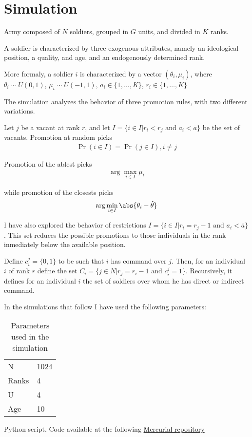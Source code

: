 \section{Simulation}
\label{sec:simulation}

Army composed of $N$ soldiers, grouped in $G$ units, and divided in $K$ ranks.

A soldier is characterized by three exogenous attributes, namely an ideological position, a quality, and age, and an
endogenously determined rank.

More formaly, a soldier $i$ is characterized by a vector $(\theta_i, \mu_i)$, where $\theta_i \sim U(0,1)$, $\mu_i \sim U(-1,1)$, $a_i
\in \{1, \dots ,K\}$, $r_i \in \{1, \dots, K\}$

The simulation analyzes the behavior of three promotion rules, with two different variations. 

Let $j$ be a vacant at rank $r$, and let $I = \{i \in I | r_i < r_j \text{ and } a_i < \overline{a}\}$ be the set of
vacants. Promotion at random picks 
\begin{eqnarray*}
 \Pr(i \in I) = \Pr(j \in I), i \neq j
\end{eqnarray*}

Promotion of the ablest picks 
\begin{eqnarray*}
  \arg\max_{i \in I} \mu_i
\end{eqnarray*}

while promotion of the closests picks
\begin{eqnarray*}
  \arg\min_{i \in I} \abs{\theta_i - \hat \theta}
\end{eqnarray*}

I have also explored the behavior of restrictions $I = \{i \in I | r_i = r_j - 1 \text{ and } a_i <
\overline{a}\}$. This set reduces the possible promotions to those individuals in the rank inmediately below the
available position.

Define $c_i^j = \{0, 1\}$ to be such that $i$ has command over $j$. Then, for an individual $i$ of rank $r$ define the
set $C_i = \{j \in N | r_j = r_i - 1 \text{ and } c_i^j = 1\}$. Recursively, it defines for an individual $i$ the set of
soldiers over whom he has direct or indirect command.

In the simulations that follow I have used the following parameters: 

\begin{table}[!h]
  \centering
  \caption{Parameters used in the simulation}
  \begin{tabular}{ll}
    \hline
    N & 1024 \\
    Ranks & 4 \\ 
    U & 4 \\
    Age & 10 \\
    \hline
  \end{tabular}
  \label{tab:parameters}
\end{table}
Python script. Code available at the following \href{https://griverorz@bitbucket.org/griverorz/promotions}{Mercurial repository}

